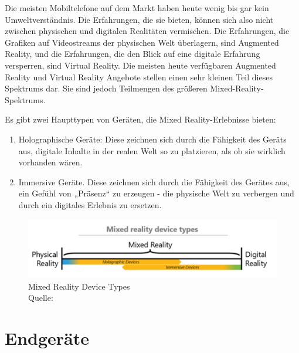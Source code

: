Die meisten Mobiltelefone auf dem Markt haben heute wenig bis gar kein Umweltverständnis. Die Erfahrungen, die sie bieten, können sich also nicht zwischen physischen und digitalen Realitäten vermischen. Die Erfahrungen, die Grafiken auf Videostreams der physischen Welt überlagern, sind Augmented Reality, und die Erfahrungen, die den Blick auf eine digitale Erfahrung versperren, sind Virtual Reality. Die meisten heute verfügbaren Augmented Reality und Virtual Reality Angebote stellen einen sehr kleinen Teil dieses Spektrums dar. Sie sind jedoch Teilmengen des größeren Mixed-Reality-Spektrums. \newline 

\noindent Es gibt zwei Haupttypen von Geräten, die Mixed Reality-Erlebnisse bieten:
\begin{enumerate}[leftmargin=*,label= \arabic*:]
	 \item Holographische Geräte: Diese zeichnen sich durch die Fähigkeit des Geräts aus, digitale Inhalte in der realen Welt so zu platzieren, als ob sie wirklich vorhanden wären. 
	  \item Immersive Geräte. Diese zeichnen sich durch die Fähigkeit des Gerätes aus, ein Gefühl von „Präsenz“ zu erzeugen - die physische Welt zu verbergen und durch ein digitales Erlebnis zu ersetzen.
\end{enumerate}

\begin{figure}[ht]
	\centering
	\includegraphics[width=\textwidth,height=\textheight,keepaspectratio]{images/Mixed Reality Device Types.png}
	\caption{Mixed Reality Device Types \\ Quelle: \cite[vgl.][]{BrandonBray}}
	\label{Mixed-Reality2}
\end{figure}

\section{Endgeräte}

